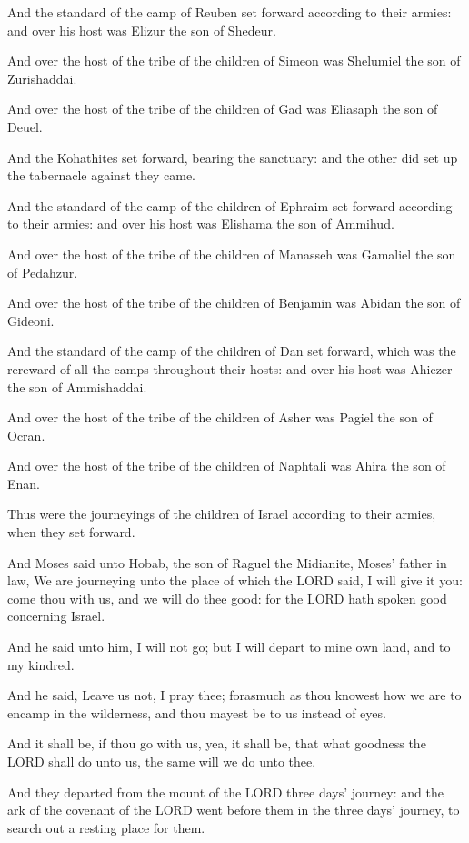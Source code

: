 \verse And the standard of the camp of Reuben set forward according to
their armies: and over his host was Elizur the son of Shedeur.

\verse And over the host of the tribe of the children of Simeon was
Shelumiel the son of Zurishaddai.

\verse And over the host of the tribe of the children of Gad was
Eliasaph the son of Deuel.

\verse And the Kohathites set forward, bearing the sanctuary: and the
other did set up the tabernacle against they came.

\verse And the standard of the camp of the children of Ephraim set
forward according to their armies: and over his host was Elishama the
son of Ammihud.

\verse And over the host of the tribe of the children of Manasseh was
Gamaliel the son of Pedahzur.

\verse And over the host of the tribe of the children of Benjamin was
Abidan the son of Gideoni.

\verse And the standard of the camp of the children of Dan set forward,
which was the rereward of all the camps throughout their hosts: and
over his host was Ahiezer the son of Ammishaddai.

\verse And over the host of the tribe of the children of Asher was
Pagiel the son of Ocran.

\verse And over the host of the tribe of the children of Naphtali was
Ahira the son of Enan.

\verse Thus were the journeyings of the children of Israel according to
their armies, when they set forward.

\verse And Moses said unto Hobab, the son of Raguel the Midianite,
Moses' father in law, We are journeying unto the place of which the
LORD said, I will give it you: come thou with us, and we will do thee
good: for the LORD hath spoken good concerning Israel.

\verse And he said unto him, I will not go; but I will depart to mine
own land, and to my kindred.

\verse And he said, Leave us not, I pray thee; forasmuch as thou
knowest how we are to encamp in the wilderness, and thou mayest be to
us instead of eyes.

\verse And it shall be, if thou go with us, yea, it shall be, that what
goodness the LORD shall do unto us, the same will we do unto thee.

\verse And they departed from the mount of the LORD three days'
journey: and the ark of the covenant of the LORD went before them in
the three days' journey, to search out a resting place for them.

